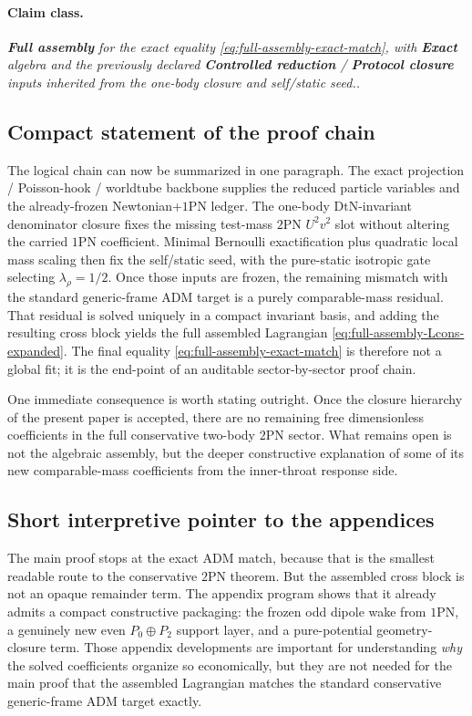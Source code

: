 \documentclass[11pt]{article}
\newcommand{\OnePN}{\mathrm{1PN}}
\newcommand{\TwoPN}{\mathrm{2PN}}
\newcommand{\ADM}{\mathrm{ADM}}
\newcommand{\DtN}{\mathrm{DtN}}
\newcommand{\Exact}{\textbf{Exact}}
\newcommand{\Controlled}{\textbf{Controlled reduction}}
\newcommand{\Protocol}{\textbf{Protocol closure}}
\newcommand{\FullMatch}{\textbf{Full assembly}}
\newcommand{\claimclass}[1]{\paragraph{Claim class.}\emph{#1.}}
\begin{document}
\claimclass{\FullMatch{} for the exact equality
\cref{eq:full-assembly-exact-match}, with \Exact{} algebra and the previously declared
\Controlled{} / \Protocol{} inputs inherited from the one-body closure and self/static
seed.}

\subsection{Compact statement of the proof chain}
\label{sec:full-assembly-proof-chain}

The logical chain can now be summarized in one paragraph.
The exact projection / Poisson-hook / worldtube backbone supplies the reduced particle
variables and the already-frozen Newtonian+\(\OnePN\) ledger.  The one-body
\(\DtN\)-invariant denominator closure fixes the missing test-mass \(\TwoPN\)
\(U^2v^2\) slot without altering the carried \(\OnePN\) coefficient.  Minimal Bernoulli
exactification plus quadratic local mass scaling then fix the self/static seed, with the
pure-static isotropic gate selecting \(\lambda_\rho=1/2\).  Once those inputs are frozen,
the remaining mismatch with the standard generic-frame \(\ADM\) target is a purely
comparable-mass residual.  That residual is solved uniquely in a compact invariant basis,
and adding the resulting cross block yields the full assembled Lagrangian
\cref{eq:full-assembly-Lcons-expanded}.  The final equality
\cref{eq:full-assembly-exact-match} is therefore not a global fit; it is the end-point of
an auditable sector-by-sector proof chain.

One immediate consequence is worth stating outright.  Once the closure hierarchy of the
present paper is accepted, there are no remaining free dimensionless coefficients in the
full conservative two-body \(\TwoPN\) sector.  What remains open is not the algebraic
assembly, but the deeper constructive explanation of some of its new comparable-mass
coefficients from the inner-throat response side.

\subsection{Short interpretive pointer to the appendices}
\label{sec:full-assembly-interpretive-pointer}

The main proof stops at the exact \(\ADM\) match, because that is the smallest readable
route to the conservative \(\TwoPN\) theorem.  But the assembled cross block is not an
opaque remainder term.  The appendix program shows that it already admits a compact
constructive packaging: the frozen odd dipole wake from \(\OnePN\), a genuinely new even
\(P_0\oplus P_2\) support layer, and a pure-potential geometry-closure term.  Those
appendix developments are important for understanding \emph{why} the solved coefficients
organize so economically, but they are not needed for the main proof that the assembled
Lagrangian matches the standard conservative generic-frame \(\ADM\) target exactly.
\end{document}

